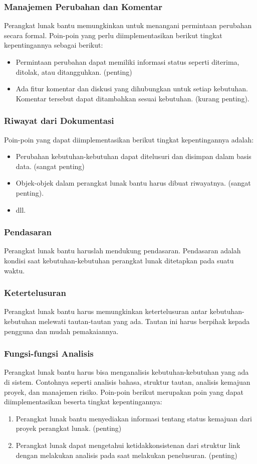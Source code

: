 \subsubsection{Manajemen Perubahan dan Komentar}
Perangkat lunak bantu memungkinkan untuk menangani permintaan perubahan secara formal. Poin-poin yang perlu diimplementasikan berikut tingkat kepentingannya sebagai berikut:
\begin{itemize}
\item	Permintaan perubahan dapat memiliki informasi status seperti diterima, ditolak, atau ditangguhkan. (penting)
\item	Ada fitur komentar dan diskusi yang dihubungkan untuk setiap kebutuhan. Komentar tersebut dapat ditambahkan sesuai kebutuhan. (kurang penting).
\end{itemize}
\subsubsection{Riwayat dari Dokumentasi}
Poin-poin yang dapat diimplementasikan berikut tingkat kepentingannya adalah:
\begin{itemize}
\item	Perubahan kebutuhan-kebutuhan dapat ditelusuri dan disimpan dalam basis data. (sangat penting)
\item	Objek-objek dalam perangkat lunak bantu harus dibuat riwayatnya. (sangat penting).
\item	dll.
\end{itemize}

\subsubsection{Pendasaran}
Perangkat lunak bantu haruslah mendukung pendasaran. Pendasaran adalah kondisi saat kebutuhan-kebutuhan perangkat lunak ditetapkan pada suatu waktu.

\subsubsection{Ketertelusuran}
Perangkat lunak bantu harus memungkinkan ketertelusuran antar kebutuhan-kebutuhan melewati tautan-tautan yang ada. Tautan ini harus berpihak kepada pengguna dan mudah pemakaiannya.

\subsubsection{Fungsi-fungsi Analisis}
Perangkat lunak bantu harus bisa menganalisis kebutuhan-kebutuhan yang ada di sistem. Contohnya seperti analisis bahasa, struktur tautan, analisis kemajuan proyek, dan manajemen risiko. Poin-poin berikut merupakan poin yang dapat diimplementasikan beserta tingkat kepentingannya:
\begin{enumerate}
\item	Perangkat lunak bantu menyediakan informasi tentang status kemajuan dari proyek perangkat lunak. (penting)
\item	Perangkat lunak dapat mengetahui ketidakkonsistenan dari struktur link dengan melakukan analisis pada saat melakukan penelusuran. (penting)
\end{enumerate}
